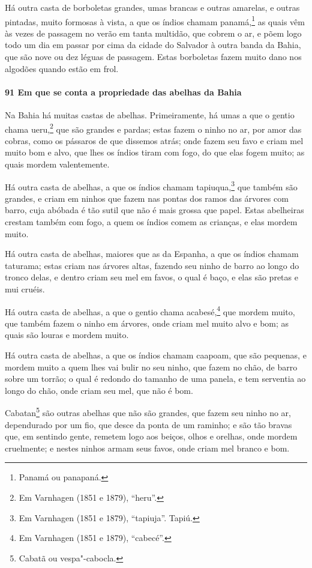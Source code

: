 \begin{linenumbers}
Há outra casta de borboletas grandes, umas brancas e outras amarelas, e outras pintadas,
muito formosas à vista, a que os índios chamam panamá,\footnote{ Panamá ou panapaná.} as
quais vêm às vezes de passagem no verão em tanta multidão, que cobrem o ar, e põem logo
todo um dia em passar por cima da cidade do Salvador à outra banda da Bahia, que são nove
ou dez léguas de passagem. Estas borboletas fazem muito dano nos algodões quando estão em
frol.

\paragraph{91 Em que se conta a propriedade das abelhas da Bahia}\quad
Na Bahia há muitas castas de abelhas. Primeiramente, há umas a que o gentio chama
ueru,\footnote{ Em Varnhagen (1851 e 1879), ``heru''.} que são grandes e pardas; estas
fazem o ninho no ar, por amor das cobras, como os pássaros de que dissemos atrás; onde
fazem seu favo e criam mel muito bom e alvo, que lhes os índios tiram com fogo, do que
elas fogem muito; as quais mordem valentemente.

Há outra casta de abelhas, a que os índios chamam tapiuqua,\footnote{ Em Varnhagen (1851 e
1879), ``tapiuja''. Tapiú.} que também são grandes, e criam em ninhos que fazem nas
pontas dos ramos das árvores com barro, cuja abóbada é tão sutil que não é mais grossa que
papel. Estas abelheiras crestam também com fogo, a quem os índios comem as crianças, e
elas mordem muito.

Há outra casta de abelhas, maiores que as da Espanha, a que os índios chamam taturama;
estas criam nas árvores altas, fazendo seu ninho de barro ao longo do tronco delas, e
dentro criam seu mel em favos, o qual é baço, e elas são pretas e mui cruéis.

Há outra casta de abelhas, a que o gentio chama acabesé,\footnote{ Em Varnhagen (1851 e
1879), ``cabecé''.} que mordem muito, que também fazem o ninho em árvores, onde criam mel
muito alvo e bom; as quais são louras e mordem muito.

Há outra casta de abelhas, a que os índios chamam caapoam, que são pequenas, e mordem
muito a quem lhes vai bulir no seu ninho, que fazem no chão, de barro sobre um torrão; o
qual é redondo do tamanho de uma panela, e tem serventia ao longo do chão, onde criam seu
mel, que não é bom.

Cabatan\footnote{ Cabatã ou vespa"-cabocla.} são outras abelhas que não são grandes, que
fazem seu ninho no ar, dependurado por um fio, que desce da ponta de um raminho; e são tão
bravas que, em sentindo gente, remetem logo aos beiços, olhos e orelhas, onde mordem
cruelmente; e nestes ninhos armam seus favos, onde criam mel branco e bom.


\end{linenumbers}
